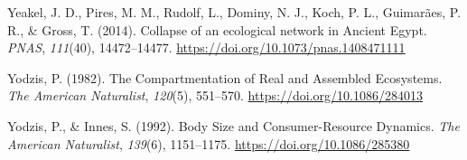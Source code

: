 \documentclass[
]{article}
\newlength{\cslhangindent}
\newenvironment{CSLReferences}[2] %
 {\begin{list}{}{%
  \setlength{\itemindent}{0pt}
  \setlength{\leftmargin}{0pt}
  \setlength{\parsep}{0pt}
  \ifodd #1
   \setlength{\leftmargin}{\cslhangindent}
   \setlength{\itemindent}{-1\cslhangindent}
  \fi
  \setlength{\itemsep}{#2\baselineskip}}}
 {\end{list}}
\begin{document}
\begin{CSLReferences}{1}{0}
Yeakel, J. D., Pires, M. M., Rudolf, L., Dominy, N. J., Koch, P. L.,
Guimarães, P. R., \& Gross, T. (2014). Collapse of an ecological network
in {Ancient Egypt}. \emph{PNAS}, \emph{111}(40), 14472--14477.
\url{https://doi.org/10.1073/pnas.1408471111}

Yodzis, P. (1982). The {Compartmentation} of {Real} and {Assembled
Ecosystems}. \emph{The American Naturalist}, \emph{120}(5), 551--570.
\url{https://doi.org/10.1086/284013}

Yodzis, P., \& Innes, S. (1992). Body {Size} and {Consumer-Resource
Dynamics}. \emph{The American Naturalist}, \emph{139}(6), 1151--1175.
\url{https://doi.org/10.1086/285380}

\end{CSLReferences}
\end{document}

